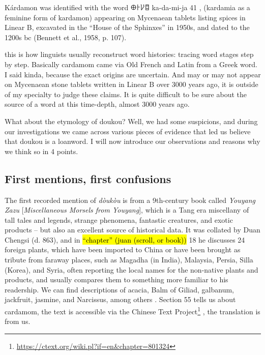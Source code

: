 \documentclass[12pt]{article}
\newcommand{\tc}[1]{\traditionalchinesefont{#1}\rmfamily}
\begin{document}
Kárdamon was identified with the word 𐀏𐀅𐀖𐀊 ka-da-mi-ja 41 , (kardamia as a feminine form of kardamon) appearing on Mycenaean tablets listing spices in Linear B, excavated in the “House of the Sphinxes” in 1950s, and dated to the 1200s bc (Bennett et al., 1958, p. 107).



this is how linguists usually reconstruct word histories: tracing word stages step by step. Basically cardamom came via Old French and Latin from a Greek word. I said kinda, because the exact origins are uncertain. And may or may not appear on Mycenaean stone tablets written in Linear B over 3000 years ago, it is outside of my specialty to judge these claims. It is quite difficult to be sure about the source of a word at this time-depth, almost 3000 years ago.

What about the etymology of doukou? Well, we had some suspicions, and during our investigations we came across various pieces of evidence that led us believe that doukou is a loanword. I will now introduce our observations and reasons why we think so in 4 points.

\subsection{First mentions, first confusions}

The first recorded mention of \tc{豆蔻} \textit{dòukòu} is from a 9th-century book called \tc{酉陽雜俎} \textit{Youyang Zazu} [\textit{Miscellaneous Morsels from Youyang}], which is a Tang era miscellany of tall tales and legends, strange phenomena, fantastic creatures, and exotic products -- but also an excellent source of historical data. It was collated by Duan Chengsi (d. 863), and in \hl{``chapter'' (juan (scroll, or book))} 18 he discusses 24 foreign plants, which have been imported to China or have been brought as tribute from faraway places, such as Magadha (in India), Malaysia, Persia, Silla (Korea), and Syria, often reporting the local names for the non-native plants and products, and usually compares them to something more familiar to his readership. We can find descriptions of acacia, Balm of Giliad, galbanum, jackfruit, jasmine, and Narcissus, among others \parencite{reed_2003_tang}. Section 55 tells us about cardamom, the text is accessible via the Chinese Text Project\footnote{\url{https://ctext.org/wiki.pl?if=en&chapter=801324}} \parencite{sturgeon_2021_chinese}, the translation is from us.
\end{document}
